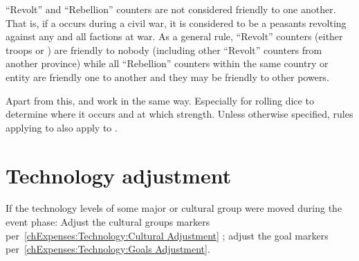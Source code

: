 \aparag ``Revolt'' and ``Rebellion'' counters are not considered
friendly to one another. That is, if a \RD occurs during a civil war, it
is considered to be a peasants revolting against any and all factions at
war.
\bparag As a general rule, ``Revolt'' counters (either troops or
\REVOLT) are friendly to nobody (including other ``Revolt'' counters
from another province) while all ``Rebellion'' counters within the same
country or entity are friendly one to another and they may be friendly
to other powers.

\aparag Apart from this, \REVOLT and \REBELLION work in the same
way. Especially for rolling dice to determine where it occurs and at
which strength.
\bparag Unless otherwise specified, rules applying to \REVOLT also apply
to \REBELLION.

\section{Technology adjustment}\label{chEvents:Technology}

\aparag If the technology levels of some major or cultural group were
moved during the event phase:
\bparag Adjust the cultural groups markers
per~\ref{chExpenses:Technology:Cultural Adjustment} ;
\bparag adjust the goal markers per~\ref{chExpenses:Technology:Goals
  Adjustment}.
